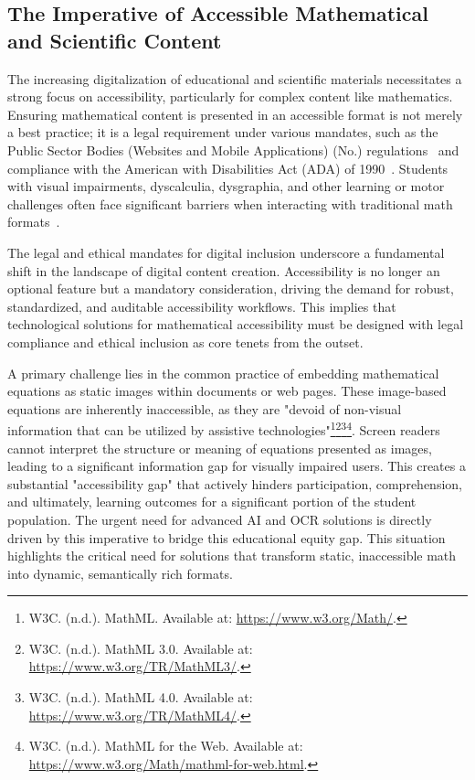 \subsection{The Imperative of Accessible Mathematical and Scientific Content}
The increasing digitalization of educational and scientific materials necessitates a strong focus on accessibility, particularly for complex content like mathematics. Ensuring mathematical content is presented in an accessible format is not merely a best practice; it is a legal requirement under various mandates, such as the Public Sector Bodies (Websites and Mobile Applications) (No.) regulations~\cite{PublicSectorBodiesRegulations2018} and compliance with the American with Disabilities Act (ADA) of 1990~\cite{ADA1990}. Students with visual impairments, dyscalculia, dysgraphia, and other learning or motor challenges often face significant barriers when interacting with traditional math formats~\cite{TexthelpEquatio}\cite{TexthelpEquatioPricing}\cite{ASUImageAccessibilityGenerator}\cite{PerkinsMathKicker}\cite{Modmath}\cite{UWAccessibleMath}.

The legal and ethical mandates for digital inclusion underscore a fundamental shift in the landscape of digital content creation. Accessibility is no longer an optional feature but a mandatory consideration, driving the demand for robust, standardized, and auditable accessibility workflows. This implies that technological solutions for mathematical accessibility must be designed with legal compliance and ethical inclusion as core tenets from the outset.

A primary challenge lies in the common practice of embedding mathematical equations as static images within documents or web pages. These image-based equations are inherently inaccessible, as they are "devoid of non-visual information that can be utilized by assistive technologies"\footnote{W3C. (n.d.). MathML. Available at: \url{https://www.w3.org/Math/}.}\footnote{W3C. (n.d.). MathML 3.0. Available at: \url{https://www.w3.org/TR/MathML3/}.}\footnote{W3C. (n.d.). MathML 4.0. Available at: \url{https://www.w3.org/TR/MathML4/}.}\footnote{W3C. (n.d.). MathML for the Web. Available at: \url{https://www.w3.org/Math/mathml-for-web.html}.}. Screen readers cannot interpret the structure or meaning of equations presented as images, leading to a significant information gap for visually impaired users. This creates a substantial "accessibility gap" that actively hinders participation, comprehension, and ultimately, learning outcomes for a significant portion of the student population. The urgent need for advanced AI and OCR solutions is directly driven by this imperative to bridge this educational equity gap. This situation highlights the critical need for solutions that transform static, inaccessible math into dynamic, semantically rich formats.

